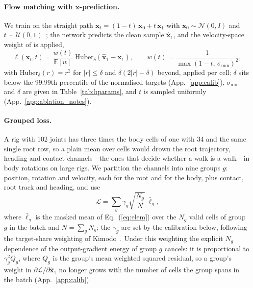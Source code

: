 \paragraph{Flow matching with $\mathbf{x}$-prediction.} We train on the straight path
$\mathbf{x}_t=(1-t)\,\mathbf{x}_0+t\,\mathbf{x}_1$ with $\mathbf{x}_0\sim\mathcal{N}(0,I)$ and
$t\sim\mathcal{U}(0,1)$~\citep{lipman2023flow,liu2023rectified}; the network predicts the clean
sample $\hat{\mathbf{x}}_1$, and the velocity-space weight of \citet{li2025jit} is applied,
\begin{equation}
  \ell(\mathbf{x}_t,t)=\frac{w(t)}{\mathbb{E}[w]}\;\mathrm{Huber}_{\delta}\!\left(\hat{\mathbf{x}}_1-\mathbf{x}_1\right),
  \qquad w(t)=\frac{1}{\max(1-t,\,\sigma_{\min})^{2}},
  \label{eq:elem}
\end{equation}
with $\mathrm{Huber}_{\delta}(r)=r^{2}$ for $|r|\le\delta$ and $\delta(2|r|-\delta)$ beyond, applied per cell;
$\delta$ sits below the 99.99th percentile of the normalised targets (App.~\ref{app:calib}), $\sigma_{\min}$
and $\delta$ are given in Table~\ref{tab:hparams}, and $t$ is sampled uniformly (App.~\ref{app:ablation_notes}).

\paragraph{Grouped loss.} A rig with 102 joints has three times the body cells of one with 34 and
the same single root row, so a plain mean over cells would drown the root trajectory, heading and
contact channels---the ones that decide whether a walk is a walk---in body rotations on large rigs.
We partition the channels into nine groups $g$: position, rotation and velocity, each for the root and
for the body, plus contact, root track and heading, and use
\begin{equation}
  \mathcal{L}=\sum_{g}\gamma_g\sqrt{\frac{N_g}{N}}\;\bar{\ell}_g,
  \label{eq:grouped}
\end{equation}
where $\bar{\ell}_g$ is the masked mean of Eq.~(\ref{eq:elem}) over the $N_g$ valid cells of group
$g$ in the batch and $N=\sum_g N_g$; the $\gamma_g$ are set by the calibration below, following the
target-share weighting of Kimodo~\citep{rempe2026kimodo}.
Under this weighting the explicit $N_g$ dependence of the output-gradient energy of group $g$
cancels: it is proportional to $\gamma_g^{2}Q_g$, where $Q_g$ is the group's mean weighted squared
residual, so a group's weight in $\partial\mathcal{L}/\partial\hat{\mathbf{x}}_1$ no longer grows
with the number of cells the group spans in the batch (App.~\ref{app:calib}).

